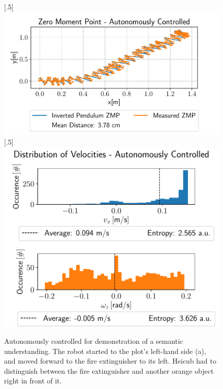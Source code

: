 \begin{figure}[h!]
	[.5\linewidth]{\includegraphics[scale=.45]{chapters/04_experiments/02_autonomous_walking/semantic_walk_01_zmp.pdf}}
	[.5\linewidth]{\includegraphics[scale=.45]{chapters/04_experiments/02_autonomous_walking/semantic_walk_01_entropy.pdf}}
	\caption{Autonomously controlled for demonstration of a semantic understanding. The robot started to the plot's left-hand side (a), and moved forward to the fire extinguisher to its left. Heicub had to distinguish between the fire extinguisher and another orange object right in front of it.}
	\label{fig::424_aw_additional_semantic}
\end{figure}
\FloatBarrier
